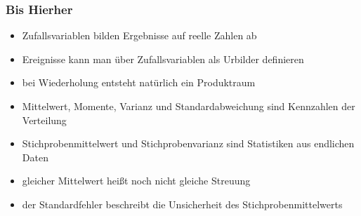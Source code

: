\documentclass[aspectratio=169,professionalfonts]{beamer}
\begin{document}
\begin{frame}
  \frametitle{Bis Hierher}

  \begin{itemize}
    \item Zufallsvariablen bilden Ergebnisse auf reelle Zahlen ab
    \item Ereignisse kann man \"uber Zufallsvariablen als Urbilder definieren
    \item bei Wiederholung entsteht nat\"urlich ein Produktraum
    \item Mittelwert, Momente, Varianz und Standardabweichung sind Kennzahlen der Verteilung
    \item Stichprobenmittelwert und Stichprobenvarianz sind Statistiken aus endlichen Daten
    \item gleicher Mittelwert hei\ss t noch nicht gleiche Streuung
    \item der Standardfehler beschreibt die Unsicherheit des Stichprobenmittelwerts
  \end{itemize}
\end{frame}
\end{document}
